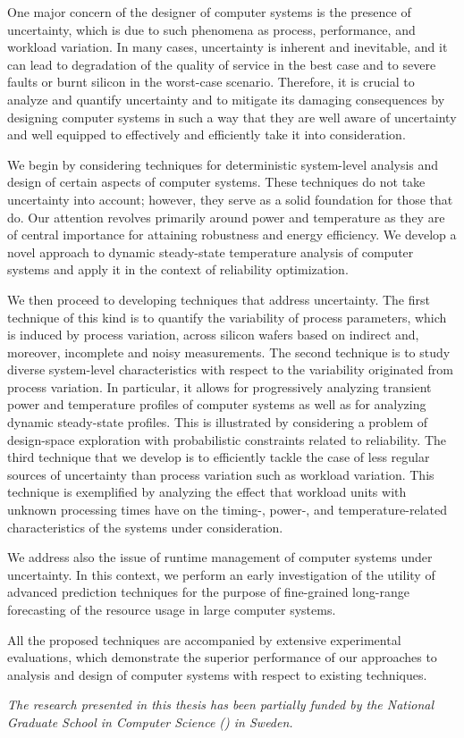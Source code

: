 One major concern of the designer of computer systems is the presence of
uncertainty, which is due to such phenomena as process, performance, and
workload variation. In many cases, uncertainty is inherent and inevitable, and
it can lead to degradation of the quality of service in the best case and to
severe faults or burnt silicon in the worst-case scenario. Therefore, it is
crucial to analyze and quantify uncertainty and to mitigate its damaging
consequences by designing computer systems in such a way that they are well
aware of uncertainty and well equipped to effectively and efficiently take it
into consideration.

We begin by considering techniques for deterministic system-level analysis and
design of certain aspects of computer systems. These techniques do not take
uncertainty into account; however, they serve as a solid foundation for those
that do. Our attention revolves primarily around power and temperature as they
are of central importance for attaining robustness and energy efficiency. We
develop a novel approach to dynamic steady-state temperature analysis of
computer systems and apply it in the context of reliability optimization.

We then proceed to developing techniques that address uncertainty. The first
technique of this kind is to quantify the variability of process parameters,
which is induced by process variation, across silicon wafers based on indirect
and, moreover, incomplete and noisy measurements. The second technique is to
study diverse system-level characteristics with respect to the variability
originated from process variation. In particular, it allows for progressively
analyzing transient power and temperature profiles of computer systems as well
as for analyzing dynamic steady-state profiles. This is illustrated by
considering a problem of design-space exploration with probabilistic constraints
related to reliability. The third technique that we develop is to efficiently
tackle the case of less regular sources of uncertainty than process variation
such as workload variation. This technique is exemplified by analyzing the
effect that workload units with unknown processing times have on the timing-,
power-, and temperature-related characteristics of the systems under
consideration.

We address also the issue of runtime management of computer systems under
uncertainty. In this context, we perform an early investigation of the utility
of advanced prediction techniques for the purpose of fine-grained long-range
forecasting of the resource usage in large computer systems.

All the proposed techniques are accompanied by extensive experimental
evaluations, which demonstrate the superior performance of our approaches to
analysis and design of computer systems with respect to existing techniques.

\vspace{1em}
\noindent
\emph{The research presented in this thesis has been partially funded by the
National Graduate School in Computer Science () in Sweden.}
